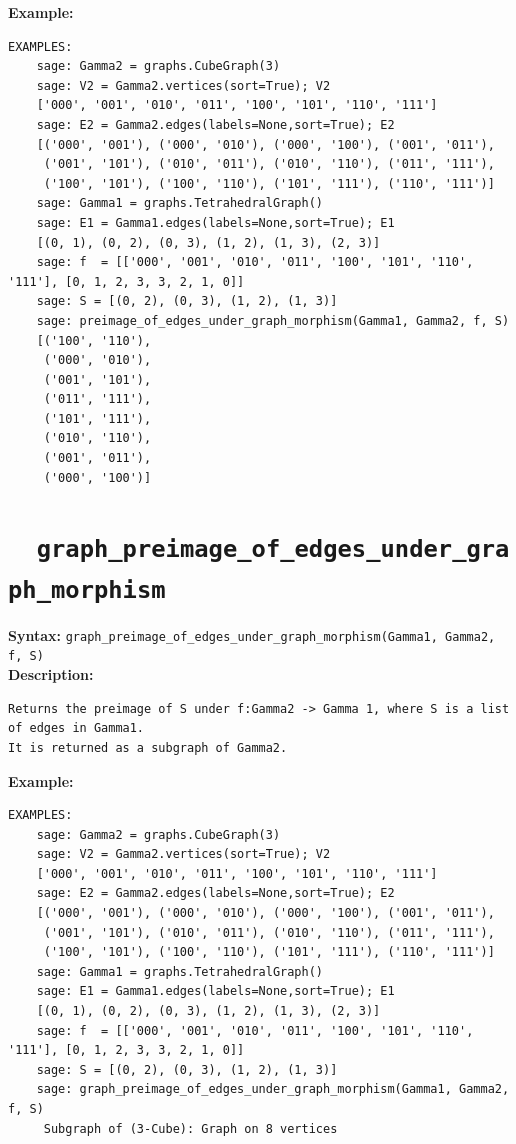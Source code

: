 \documentclass{article}
\begin{document}
\textbf{Example:}
\begin{verbatim}
EXAMPLES:
    sage: Gamma2 = graphs.CubeGraph(3)
    sage: V2 = Gamma2.vertices(sort=True); V2  
    ['000', '001', '010', '011', '100', '101', '110', '111']
    sage: E2 = Gamma2.edges(labels=None,sort=True); E2 
    [('000', '001'), ('000', '010'), ('000', '100'), ('001', '011'),
     ('001', '101'), ('010', '011'), ('010', '110'), ('011', '111'),
     ('100', '101'), ('100', '110'), ('101', '111'), ('110', '111')]
    sage: Gamma1 = graphs.TetrahedralGraph() 
    sage: E1 = Gamma1.edges(labels=None,sort=True); E1       
    [(0, 1), (0, 2), (0, 3), (1, 2), (1, 3), (2, 3)]
    sage: f  = [['000', '001', '010', '011', '100', '101', '110', '111'], [0, 1, 2, 3, 3, 2, 1, 0]] 
    sage: S = [(0, 2), (0, 3), (1, 2), (1, 3)]         
    sage: preimage_of_edges_under_graph_morphism(Gamma1, Gamma2, f, S) 
    [('100', '110'),
     ('000', '010'),
     ('001', '101'),
     ('011', '111'),
     ('101', '111'),
     ('010', '110'),
     ('001', '011'),
     ('000', '100')]
\end{verbatim}

\section{\tt \ \ graph\_preimage\_of\_edges\_under\_graph\_morphism}

\textbf{Syntax:} \verb}graph_preimage_of_edges_under_graph_morphism(Gamma1, Gamma2, f, S)}\\

\textbf{Description:}
\begin{verbatim}
Returns the preimage of S under f:Gamma2 -> Gamma 1, where S is a list of edges in Gamma1. 
It is returned as a subgraph of Gamma2.
\end{verbatim}

\textbf{Example:}
\begin{verbatim}
EXAMPLES:
    sage: Gamma2 = graphs.CubeGraph(3)
    sage: V2 = Gamma2.vertices(sort=True); V2  
    ['000', '001', '010', '011', '100', '101', '110', '111']
    sage: E2 = Gamma2.edges(labels=None,sort=True); E2 
    [('000', '001'), ('000', '010'), ('000', '100'), ('001', '011'),
     ('001', '101'), ('010', '011'), ('010', '110'), ('011', '111'),
     ('100', '101'), ('100', '110'), ('101', '111'), ('110', '111')]
    sage: Gamma1 = graphs.TetrahedralGraph() 
    sage: E1 = Gamma1.edges(labels=None,sort=True); E1       
    [(0, 1), (0, 2), (0, 3), (1, 2), (1, 3), (2, 3)]
    sage: f  = [['000', '001', '010', '011', '100', '101', '110', '111'], [0, 1, 2, 3, 3, 2, 1, 0]] 
    sage: S = [(0, 2), (0, 3), (1, 2), (1, 3)]       
    sage: graph_preimage_of_edges_under_graph_morphism(Gamma1, Gamma2, f, S) 
     Subgraph of (3-Cube): Graph on 8 vertices
\end{verbatim}
\end{document}
